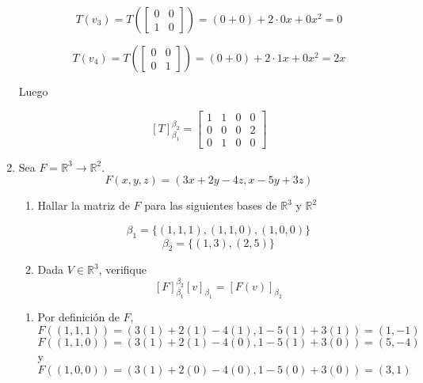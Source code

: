 \documentclass{report}
\begin{document}
\begin{enumerate}
        $$T(v_3) = T \left(\begin{bmatrix}
            0 & 0 \\
            1 & 0
        \end{bmatrix}\right) = (0 + 0) + 2\cdot 0x + 0x^2 = 0$$

        $$T(v_4) = T \left(\begin{bmatrix}
            0 & 0 \\
            0 & 1
        \end{bmatrix}\right) = (0 + 0) + 2\cdot 1x + 0x^2 = 2x$$

        Luego

        $$[T]_{\beta_1}^{\beta_2} = \begin{bmatrix}
            1 & 1 & 0 & 0\\
            0 & 0 & 0 & 2\\
            0 & 1 & 0 & 0
        \end{bmatrix}$$

        \item Sea $F=\mathbb{R}^3 \to \mathbb{R}^2$.
        $$
        F(x, y, z)=(3x+2y-4z, x-5y+3z)
        $$
        \begin{enumerate}
            \item Hallar la matriz de $F$ para las siguientes bases de $\mathbb{R}^3$ y $\mathbb{R}^2$

            $$\beta_1=\{(1,1,1),(1,1,0),(1,0,0)\}$$
            $$\beta_2=\{(1,3),(2,5)\}$$

            \item Dada $V \in \mathbb{R}^3$, verifique
            $$[F]_{\beta_1}^{\beta_2}[v]_{\beta_1}=[F(v)]_{\beta_2}$$
        \end{enumerate}
        
        \begin{enumerate}
            \item Por definición de $F$, 
            $$F((1,1,1)) = (3(1) + 2(1) - 4(1), 1-5(1)+3(1)) = (1,-1)$$
            $$F((1,1,0)) = (3(1) + 2(1) - 4(0), 1-5(1)+3(0)) = (5, -4)$$ y
            $$F((1,0,0)) = (3(1) + 2(0) - 4(0), 1-5(0)+3(0)) = (3, 1)$$


\end{enumerate}
\end{enumerate}
\end{document}
